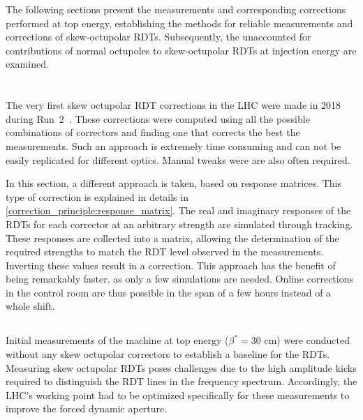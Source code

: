 The following sections present the measurements and corresponding corrections performed at top
energy, establishing the methods for reliable measurements and corrections of skew-octupolar RDTs.
Subsequently, the unaccounted for contributions of normal octupoles to skew-octupolar RDTs at
injection energy are examined.



\section{}

The very first skew octupolar RDT corrections in the LHC were made in 2018 during
Run~2~\cite{carlier_nonlinear_2020}. These corrections were computed using all the possible
combinations of correctors and finding one that corrects the best the measurements. Such an approach
is extremely time consuming and can not be easily replicated for different optics. Manual tweaks
were are also often required.

In this section, a different approach is taken, based on response matrices. This type of correction
is explained in details in \cref{correction_principle:response_matrix}. The real and imaginary 
responses of the RDTs for each corrector at an arbitrary strength are simulated through tracking.
These responses are collected into a matrix, allowing the determination of the required strengths to
match the RDT level observed in the measurements. Inverting these values result in a correction.
This approach has the benefit of being remarkably faster, as only a few simulations are needed.
Online corrections in the control room are thus possible in the span of a few hours instead of a
whole shift.


\FloatBarrier
\subsection{}

Initial measurements of the machine at top energy ($\beta^*=30$ cm) were conducted without any
skew octupolar correctors to establish a baseline for the RDTs. Measuring skew octupolar RDTs poses
challenges due to the high amplitude kicks required to distinguish the RDT lines in the frequency
spectrum. Accordingly, the LHC's working point had to be optimized specifically for these
measurements to improve the forced dynamic aperture.

